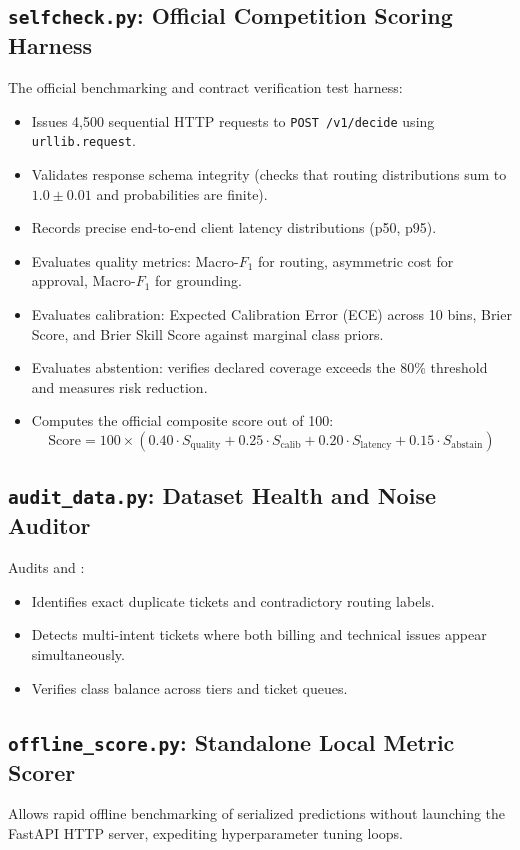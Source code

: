 \documentclass[11pt,a4paper]{article}
\begin{document}
\subsection{\texttt{selfcheck.py}: Official Competition Scoring Harness}
The official benchmarking and contract verification test harness:
\begin{itemize}
  \item Issues 4,500 sequential HTTP requests to \texttt{POST /v1/decide} using \texttt{urllib.request}.
  \item Validates response schema integrity (checks that routing distributions sum to $1.0 \pm 0.01$ and probabilities are finite).
  \item Records precise end-to-end client latency distributions (p50, p95).
  \item Evaluates quality metrics: Macro-$F_1$ for routing, asymmetric cost for approval, Macro-$F_1$ for grounding.
  \item Evaluates calibration: Expected Calibration Error (ECE) across 10 bins, Brier Score, and Brier Skill Score against marginal class priors.
  \item Evaluates abstention: verifies declared coverage exceeds the 80\% threshold and measures risk reduction.
  \item Computes the official composite score out of 100:
  $$\text{Score} = 100 \times \left( 0.40 \cdot S_{\text{quality}} + 0.25 \cdot S_{\text{calib}} + 0.20 \cdot S_{\text{latency}} + 0.15 \cdot S_{\text{abstain}} \right)$$
\end{itemize}

\subsection{\texttt{audit\_data.py}: Dataset Health and Noise Auditor}
Audits  and :
\begin{itemize}
  \item Identifies exact duplicate tickets and contradictory routing labels.
  \item Detects multi-intent tickets where both billing and technical issues appear simultaneously.
  \item Verifies class balance across tiers and ticket queues.
\end{itemize}

\subsection{\texttt{offline\_score.py}: Standalone Local Metric Scorer}
Allows rapid offline benchmarking of serialized predictions without launching the FastAPI HTTP server, expediting hyperparameter tuning loops.
\end{document}
